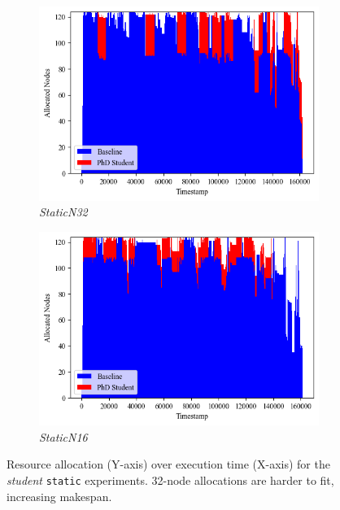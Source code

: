 \documentclass[a4paper,fleqn]{cas-dc}
\begin{document}
\begin{figure}[tbp]
    \centering

    \begin{subfigure}[t]{0.75\textwidth}
        \centering
        \includegraphics[clip, width=\linewidth, trim={0.1cm 1.15cm 0.1cm 0.2cm}]{figures/StaticN32.png}
        \caption{\textit{StaticN32}}
        \label{multifig:static32}
        \vspace{3mm}
    \end{subfigure}

    \begin{subfigure}[t]{0.75\textwidth}
        \centering
        \includegraphics[clip, width=\linewidth, trim={0.1cm 0.1cm 0.1cm 0cm}]{figures/StaticN16.png}
        \caption{\textit{StaticN16}}
        \label{multifig:static16}
    \end{subfigure}

    \caption{
    Resource allocation (Y-axis) over execution time (X-axis) for the \textit{student} \texttt{static} experiments. 32-node allocations are harder to fit, increasing makespan.}
    \label{fig:static-experiments}
\end{figure}
\end{document}
